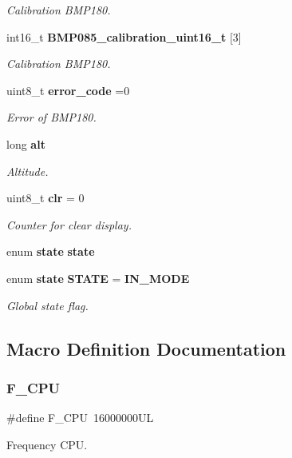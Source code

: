 \begin{DoxyCompactItemize}
\begin{DoxyCompactList}\small\item\em Calibration B\+M\+P180. \end{DoxyCompactList}\item 
int16\+\_\+t \textbf{ B\+M\+P085\+\_\+calibration\+\_\+uint16\+\_\+t} [3]
\begin{DoxyCompactList}\small\item\em Calibration B\+M\+P180. \end{DoxyCompactList}\item 
uint8\+\_\+t \textbf{ error\+\_\+code} =0
\begin{DoxyCompactList}\small\item\em Error of B\+M\+P180. \end{DoxyCompactList}\item 
long \textbf{ alt}
\begin{DoxyCompactList}\small\item\em Altitude. \end{DoxyCompactList}\item 
uint8\+\_\+t \textbf{ clr} = 0
\begin{DoxyCompactList}\small\item\em Counter for clear display. \end{DoxyCompactList}\item 
enum \textbf{ state} \textbf{ state}
\item 
enum \textbf{ state} \textbf{ S\+T\+A\+TE} = \textbf{ I\+N\+\_\+\+M\+O\+DE}
\begin{DoxyCompactList}\small\item\em Global state flag. \end{DoxyCompactList}\end{DoxyCompactItemize}


\subsection{Macro Definition Documentation}
\mbox{\label{main_8c_a43bafb28b29491ec7f871319b5a3b2f8}} 
\subsubsection{F\+\_\+\+C\+PU}
{\footnotesize\ttfamily \#define F\+\_\+\+C\+PU~16000000\+UL}



Frequency C\+PU. 



